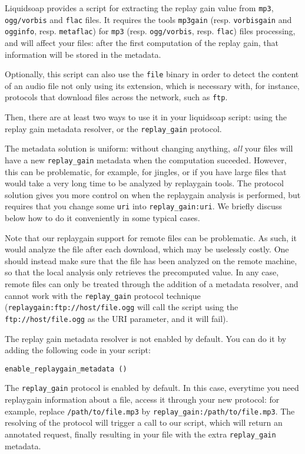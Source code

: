 Liquidsoap provides a script for extracting the replay gain value from
\verb+mp3+, \verb+ogg/vorbis+ and \verb+flac+ files. It requires the tools
\verb+mp3gain+ (resp. \verb+vorbisgain+ and \verb+ogginfo+,
resp. \verb+metaflac+) for \verb+mp3+ (resp. \verb+ogg/vorbis+,
resp. \verb+flac+) files processing, and will affect your files: after the first
computation of the replay gain, that information will be stored in the metadata.

Optionally, this script can also use the \verb+file+ binary in order to detect
the content of an audio file not only using its extension, which is necessary
with, for instance, protocols that download files across the network, such as
\verb+ftp+.

Then, there are at least two ways to use it in your liquidsoap script: using the
replay gain metadata resolver, or the \verb+replay_gain+ protocol.

The metadata solution is uniform: without changing anything, \emph{all} your
files will have a new \verb+replay_gain+ metadata when the computation
suceeded. However, this can be problematic, for example, for jingles, or if you
have large files that would take a very long time to be analyzed by replaygain
tools.  The protocol solution gives you more control on when the replaygain
analysis is performed, but requires that you change some \verb+uri+ into
\verb+replay_gain:uri+.  We briefly discuss below how to do it conveniently in
some typical cases.

Note that our replaygain support for remote files can be problematic.  As such,
it would analyze the file after each download, which may be uselessly
costly. One should instead make sure that the file has been analyzed on the
remote machine, so that the local analysis only retrieves the precomputed
value. In any case, remote files can only be treated through the addition of a
metadata resolver, and cannot work with the \verb+replay_gain+ protocol
technique (\verb+replaygain:ftp://host/file.ogg+ will call the script using the
\verb+ftp://host/file.ogg+ as the URI parameter, and it will fail).

The replay gain metadata resolver is not enabled by default. You can do it by
adding the following code in your script:
\begin{verbatim}
enable_replaygain_metadata ()
\end{verbatim}
The \verb+replay_gain+ protocol is enabled by default.  In this case, everytime
you need replaygain information about a file, access it through your new
protocol: for example, replace \verb+/path/to/file.mp3+ by
\verb+replay_gain:/path/to/file.mp3+.  The resolving of the protocol will
trigger a call to our script, which will return an annotated request, finally
resulting in your file with the extra \verb+replay_gain+ metadata.

